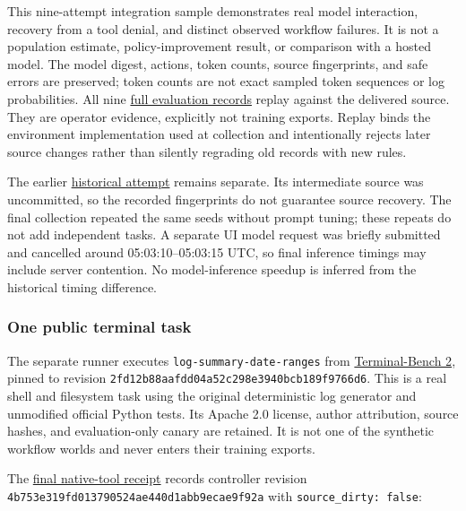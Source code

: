 \documentclass[
  11pt,
  letterpaper,
]{article}
\begin{document}
This nine-attempt integration sample demonstrates real model
interaction, recovery from a tool denial, and distinct observed workflow
failures. It is not a population estimate, policy-improvement result, or
comparison with a hosted model. The model digest, actions, token counts,
source fingerprints, and safe errors are preserved; token counts are not
exact sampled token sequences or log probabilities. All nine
\href{../../examples/benchmark-results/local-model-traces.jsonl}{full
evaluation records} replay against the delivered source. They are
operator evidence, explicitly not training exports. Replay binds the
environment implementation used at collection and intentionally rejects
later source changes rather than silently regrading old records with new
rules.

The earlier
\href{../../examples/benchmark-results/historical-attempt/local-model.json}{historical
attempt} remains separate. Its intermediate source was uncommitted, so
the recorded fingerprints do not guarantee source recovery. The final
collection repeated the same seeds without prompt tuning; these repeats
do not add independent tasks. A separate UI model request was briefly
submitted and cancelled around 05:03:10--05:03:15 UTC, so final
inference timings may include server contention. No model-inference
speedup is inferred from the historical timing difference.

\subsubsection{One public terminal task}\label{one-public-terminal-task}

The separate runner executes \texttt{log-summary-date-ranges} from
\href{https://github.com/harbor-framework/terminal-bench-2/tree/2fd12b88aafdd04a52c298e3940bcb189f9766d6/log-summary-date-ranges}{Terminal-Bench
2}, pinned to revision
\texttt{2fd12b88aafdd04a52c298e3940bcb189f9766d6}. This is a real shell
and filesystem task using the original deterministic log generator and
unmodified official Python tests. Its Apache 2.0 license, author
attribution, source hashes, and evaluation-only canary are retained. It
is not one of the synthetic workflow worlds and never enters their
training exports.

The
\href{../../artifacts/public-benchmark/native-tools-v2-final/report.json}{final
native-tool receipt} records controller revision
\texttt{4b753e319fd013790524ae440d1abb9ecae9f92a} with
\texttt{source\_dirty:\ false}:
\end{document}
